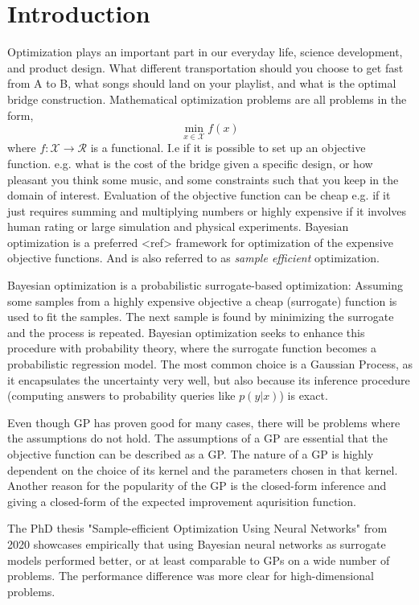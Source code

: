 \chapter{Introduction}

Optimization plays an important part in our everyday life, science development, and product design.
What different transportation should you choose to get fast from A to B, what songs should
land on your playlist, and what is the optimal bridge construction. Mathematical optimization problems 
are all problems in the form, 
$$\min_{x\in \mathcal{X}} f(x)$$ where $f: \mathcal{X} \rightarrow \mathcal{R}$ is a functional. I.e
if it is possible to set up an objective function. e.g. what is the cost of the bridge given a
specific design, or how pleasant you think some music, and some constraints such that you keep in
the domain of interest. Evaluation of the objective function can be cheap e.g. if it just requires
summing and multiplying numbers or highly expensive if it involves human rating or large simulation
and physical experiments. Bayesian optimization is a preferred <ref> framework for optimization of
the expensive objective functions. And is also referred to as \textit{sample efficient}
optimization. 

Bayesian optimization is a probabilistic surrogate-based optimization: Assuming some samples from a
highly expensive objective a cheap (surrogate) function is used to fit the samples. The next sample
is found by minimizing the surrogate and the process is repeated. Bayesian optimization seeks to
enhance this procedure with probability theory, where the surrogate function becomes a probabilistic
regression model. The most common choice is a Gaussian Process, as it encapsulates the uncertainty very well,
but also because its inference procedure (computing answers to probability queries like $p(y|x)$) is exact.

Even though GP has proven good for many cases, there will be problems where the assumptions do not hold. 
The assumptions of a GP are essential that the objective function can be described as a GP.
The nature of a GP is highly dependent on the choice of its kernel and the parameters chosen in that kernel. 
Another reason for the popularity of the GP is the closed-form inference and giving a closed-form of the 
expected improvement aqurisition function. 

The PhD thesis "Sample-efficient Optimization Using Neural Networks" from 2020 \cite{PhDthesis}
showcases empirically that using Bayesian neural networks as surrogate models performed better,
or at least comparable to GPs on a wide number of problems. The performance difference was more
clear for high-dimensional problems. 

